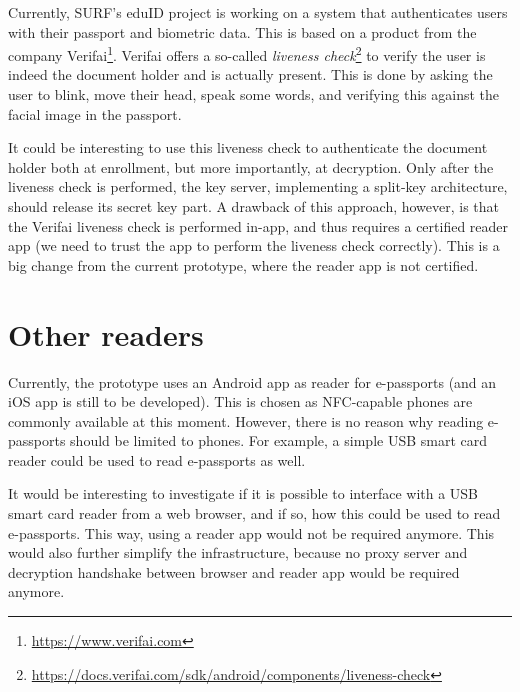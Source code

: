 Currently, SURF's eduID project is working on a system that authenticates users with their passport and biometric data.
This is based on a product from the company Verifai\footnote{\url{https://www.verifai.com}}.
Verifai offers a so-called \emph{liveness check}\footnote{\url{https://docs.verifai.com/sdk/android/components/liveness-check}} to verify the user is indeed the document holder and is actually present.
This is done by asking the user to blink, move their head, speak some words, and verifying this against the facial image in the passport.

It could be interesting to use this liveness check to authenticate the document holder both at enrollment, but more importantly, at decryption.
Only after the liveness check is performed, the key server, implementing a split-key architecture, should release its secret key part.
A drawback of this approach, however, is that the Verifai liveness check is performed in-app, and thus requires a certified reader app (we need to trust the app to perform the liveness check correctly).
This is a big change from the current prototype, where the reader app is not certified.

\section{Other readers}
\label{sec:other-readers}
Currently, the prototype uses an Android app as reader for e-passports (and an iOS app is still to be developed).
This is chosen as NFC-capable phones are commonly available at this moment.
However, there is no reason why reading e-passports should be limited to phones.
For example, a simple USB smart card reader could be used to read e-passports as well.

It would be interesting to investigate if it is possible to interface with a USB smart card reader from a web browser, and if so, how this could be used to read e-passports.
This way, using a reader app would not be required anymore.
This would also further simplify the infrastructure, because no proxy server and decryption handshake between browser and reader app would be required anymore.




